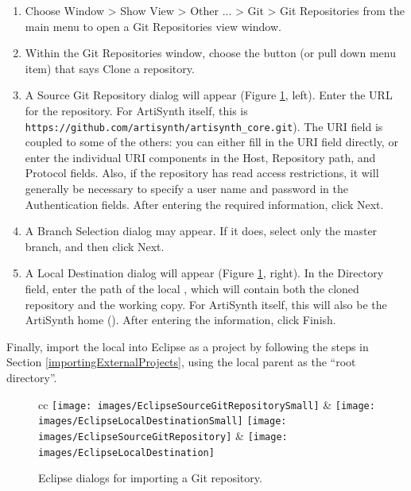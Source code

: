 \begin{enumerate}

\item Choose {\sf Window > Show View > Other ... > Git > Git Repositories} 
from the main menu to open a {\sf Git Repositories} view window.

\item Within the {\sf Git Repositories} window, choose the
button (or pull down menu item) that says {\sf Clone a repository}.

\item 
A {\sf Source Git Repository} dialog will appear (Figure
\ref{EclipseGitImport:fig}, left). Enter the URL for the
repository. For ArtiSynth itself, this is {\tt
https://github.com/artisynth/artisynth\_core.git}).  The {\sf URI}
field is coupled to some of the others: you can either fill in the
{\sf URI} field directly, or enter the individual URI components in
the {\sf Host}, {\sf Repository path}, and {\sf Protocol} fields.
Also, if the repository has read access restrictions, it will
generally be necessary to specify a user name and password in the {\sf
Authentication} fields.  After entering the required information,
click {\sf Next}. 

\item A {\sf Branch Selection} dialog may appear. If it does,
select only the {\sf master} branch, and then click {\sf Next}.

\item A {\sf Local Destination} dialog will appear (Figure
\ref{EclipseGitImport:fig}, right). In the {\sf Directory} field, enter
the path of the local \directory{}, which will contain both the cloned
repository and the working copy.  For ArtiSynth itself, this will also
be the ArtiSynth home \directory{} (\ArtHome[]).  After
entering the \directory{} information, click {\sf Finish}.

\end{enumerate}

Finally, import the local \directory{} into Eclipse as a project by
following the steps in Section \ref{importingExternalProjects}, using the
local \directory{} parent as the ``root directory''.

\begin{figure}
\begin{center}
\begin{tabular}{cc}
\iflatexml
   \texttt{[image: images/EclipseSourceGitRepositorySmall]} &
   \texttt{[image: images/EclipseLocalDestinationSmall]}
\else
   \texttt{[image: images/EclipseSourceGitRepository]} &
   \texttt{[image: images/EclipseLocalDestination]}
\fi   
\end{tabular}
\end{center}
\caption{Eclipse dialogs for importing a Git repository.}%
\label{EclipseGitImport:fig}
\end{figure}


